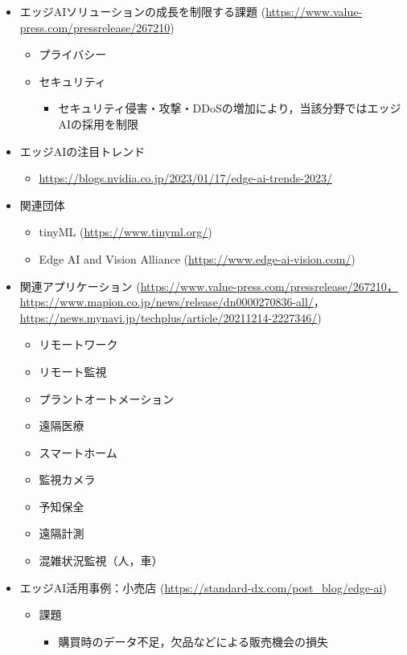 \begin{itemize}
\begin{itemize}
	\end{itemize}
	\item エッジAIソリューションの成長を制限する課題 (\url{https://www.value-press.com/pressrelease/267210})
	\begin{itemize}
		\item プライバシー
		\item セキュリティ
		\begin{itemize}
			\item セキュリティ侵害・攻撃・DDoSの増加により，当該分野ではエッジAIの採用を制限
		\end{itemize}
	\end{itemize}
	\item エッジAIの注目トレンド
	\begin{itemize}
		\item \url{https://blogs.nvidia.co.jp/2023/01/17/edge-ai-trends-2023/}
	\end{itemize}
	\item 関連団体
	\begin{itemize}
		\item tinyML (\url{https://www.tinyml.org/})
		\item Edge AI and Vision Alliance (\url{https://www.edge-ai-vision.com/})
	\end{itemize}
	\item 関連アプリケーション (\url{https://www.value-press.com/pressrelease/267210，https://www.mapion.co.jp/news/release/dn0000270836-all/}，\url{https://news.mynavi.jp/techplus/article/20211214-2227346/})
	\begin{itemize}
		\item リモートワーク
		\item リモート監視
		\item プラントオートメーション
		\item 遠隔医療
		\item スマートホーム
		\item 監視カメラ
		\item 予知保全
		\item 遠隔計測
		\item 混雑状況監視（人，車）
	\end{itemize}
	\item エッジAI活用事例：小売店 (\url{https://standard-dx.com/post_blog/edge-ai})
	\begin{itemize}
		\item 課題
		\begin{itemize}
			\item 購買時のデータ不足，欠品などによる販売機会の損失

\end{itemize}
\end{itemize}
\end{itemize}
